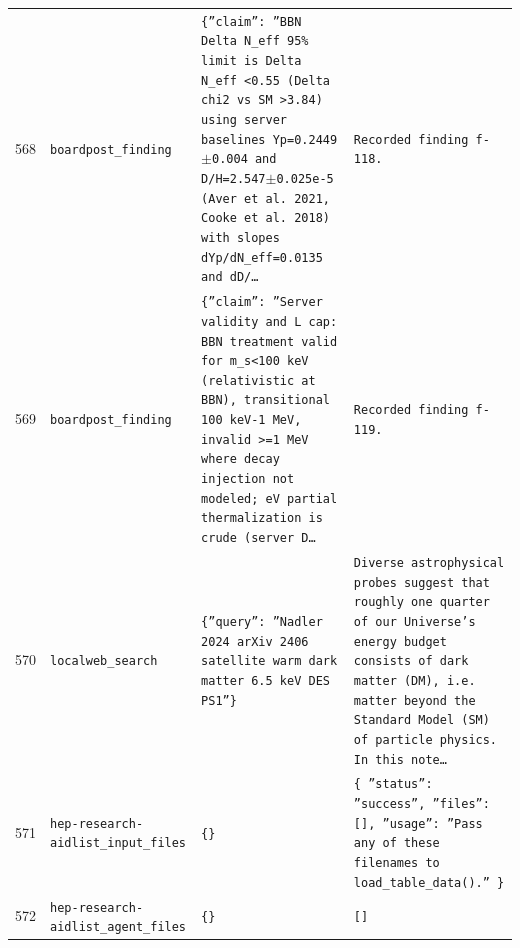 \documentclass[11pt,a4paper]{article}
\begin{document}
\begin{longtable}{@{}p{}p{}p{}p{}@{}}
568 & \texttt{board}\newline\texttt{post\_\allowbreak{}finding} & \texttt{\{''claim'':\allowbreak{} ''BBN Delta N\_\allowbreak{}eff 95\% limit is Delta N\_\allowbreak{}eff \textless{}\allowbreak{}0.55 (Delta chi2 vs SM \textgreater{}\allowbreak{}3.84)\allowbreak{} using server baselines Yp=\allowbreak{}0.2449$\pm$0.004 and D/\allowbreak{}H=\allowbreak{}2.547$\pm$0.025e-5 (Aver et al. 2021,\allowbreak{} Cooke et al. 2018)\allowbreak{} with slopes dYp/\allowbreak{}dN\_\allowbreak{}eff=\allowbreak{}0.0135 and dD/\allowbreak{}\ldots{}\allowbreak{}} & \texttt{Recorded finding f-118.} \\
569 & \texttt{board}\newline\texttt{post\_\allowbreak{}finding} & \texttt{\{''claim'':\allowbreak{} ''Server validity and L cap:\allowbreak{} BBN treatment valid for m\_\allowbreak{}s\textless{}\allowbreak{}100 keV (relativistic at BBN)\allowbreak{},\allowbreak{} transitional 100 keV-1 MeV,\allowbreak{} invalid \textgreater{}\allowbreak{}=\allowbreak{}1 MeV where decay injection not modeled;\allowbreak{} eV partial thermalization is crude (server D\ldots{}\allowbreak{}} & \texttt{Recorded finding f-119.} \\
570 & \texttt{local}\newline\texttt{web\_\allowbreak{}search} & \texttt{\{''query'':\allowbreak{} ''Nadler 2024 arXiv 2406 satellite warm dark matter 6.5 keV DES PS1''\}\allowbreak{}} & \texttt{Diverse astrophysical probes suggest that roughly one quarter of our Universe's energy budget consists of dark matter (DM)\allowbreak{},\allowbreak{} i.e. matter beyond the Standard Model (SM)\allowbreak{} of particle physics. In this note\ldots{}\allowbreak{}} \\
571 & \texttt{hep-research-aid}\newline\texttt{list\_\allowbreak{}input\_\allowbreak{}files} & \texttt{\{\}\allowbreak{}} & \texttt{\{   ''status'':\allowbreak{} ''success'',\allowbreak{}   ''files'':\allowbreak{} []\allowbreak{},\allowbreak{}   ''usage'':\allowbreak{} ''Pass any of these filenames to load\_\allowbreak{}table\_\allowbreak{}data()\allowbreak{}.'' \}\allowbreak{}} \\
572 & \texttt{hep-research-aid}\newline\texttt{list\_\allowbreak{}agent\_\allowbreak{}files} & \texttt{\{\}\allowbreak{}} & \texttt{[]\allowbreak{}} \\

\end{longtable}
\end{document}
